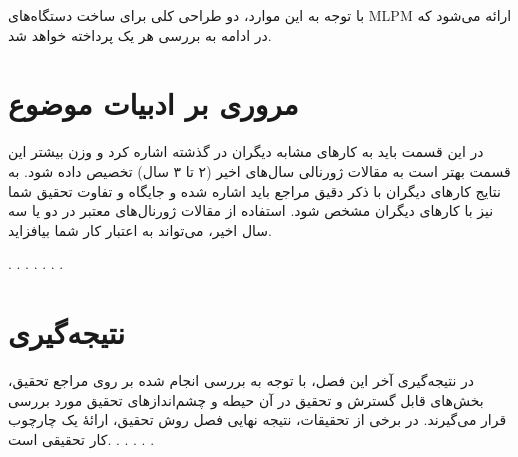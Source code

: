 با توجه به این موارد، دو طراحی کلی برای ساخت دستگاه‌های MLPM ارائه می‌شود که در ادامه به بررسی هر یک پرداخته خواهد شد.


\section{مروری بر ادبیات موضوع}
در این قسمت باید به کارهای مشابه دیگران در گذشته اشاره کرد و وزن بیشتر این قسمت بهتر است به مقالات ژورنالی سال‌های اخیر (۲ تا ۳ سال) تخصیص داده شود. به نتایج کارهای دیگران با ذکر دقیق مراجع باید اشاره شده و جایگاه و تفاوت تحقیق شما نیز با کارهای دیگران مشخص شود. استفاده از مقالات ژورنال‌های معتبر در دو یا سه سال اخیر، می‌تواند به اعتبار کار شما بیافزاید.

.
.
.
.
.
.
.


\section{نتیجه‌گیری}
‌در نتیجه‌گیری آخر این فصل، با توجه به بررسی انجام شده بر روی مراجع تحقیق، بخش‌های قابل گسترش و تحقیق در آن حیطه و چشم‌اندازهای تحقیق مورد بررسی قرار می‌گیرند.	در برخی از تحقیقات، نتیجه نهایی فصل روش تحقیق، ارائهٔ یک چارچوب کار تحقیقی 
است.
.
.
.
.
.